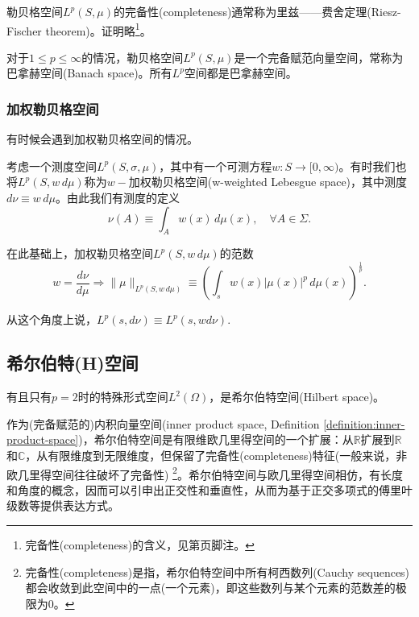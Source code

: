 勒贝格空间$L^{p}(S,\mu)$的完备性(completeness)通常称为里兹——费舍定理(Riesz-Fischer theorem)。证明略\footnote{完备性(completeness)的含义，见第\pageref{footnote:completeness-def}页脚注。}。

对于$1 \le p \le \infty$的情况，勒贝格空间$L^{p}(S,\mu)$是一个完备赋范向量空间，常称为巴拿赫空间(Banach space)。所有$L^{p}$空间都是巴拿赫空间。

\subsubsection{加权勒贝格空间}
\label{sec:lp-weightd-lp}
有时候会遇到加权勒贝格空间的情况。

\begin{definition}[加权勒贝格空间]
  \label{definition:lp-weightd-lp}
  考虑一个测度空间$L^p \left( S, \sigma, \mu \right)$，其中有一个可测方程$w : S \rightarrow [ 0, \infty)$。有时我们也将$L^p \left(S, w \, d \mu \right)$称为$w-$加权勒贝格空间(w-weighted Lebesgue space)，其中测度$d \nu \equiv w \, d \mu$。由此我们有测度的定义
  \begin{equation*}
    \nu (A) \equiv \int_A w(x) \, d \mu(x), \quad \forall A \in \Sigma.
  \end{equation*}

在此基础上，加权勒贝格空间$L^p \left(S, w \, d \mu \right)$的范数
\begin{equation*}
  w = \frac{d \nu}{d \mu} \Rightarrow \Big\| \mu \Big\|_{L^p(S, w \, d\mu)} \equiv \left(
  \int_s w(x) \left| \mu(x) \right|^p \, d \mu(x)
  \right)^{\frac{1}{p}}.
\end{equation*}

从这个角度上说，$L^p (s, d \nu) \equiv L^p ( s, w d\nu)$.
\end{definition}

\subsection{希尔伯特(H)空间}
\label{sec:lp-hilbert-space}
有且只有$p=2$时的特殊形式空间$L^2(\Omega)$，是希尔伯特空间(Hilbert space)。

作为(完备赋范的)内积向量空间(inner product space, Definition \ref{definition:inner-product-space})，希尔伯特空间是有限维欧几里得空间的一个扩展：从$\mathbb{R}$扩展到$\mathbb{R}$和$\mathbb{C}$，从有限维度到无限维度，但保留了完备性(completeness)特征(一般来说，非欧几里得空间往往破坏了完备性) \label{footnote:completeness-def}\footnote{完备性(completeness)是指，希尔伯特空间中所有柯西数列(Cauchy sequences) 都会收敛到此空间中的一点(一个元素)，即这些数列与某个元素的范数差的极限为$0$。}。希尔伯特空间与欧几里得空间相仿，有长度和角度的概念，因而可以引申出正交性和垂直性，从而为基于正交多项式的傅里叶级数等提供表达方式。

